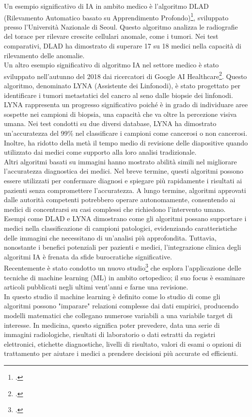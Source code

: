Un esempio significativo di IA in ambito medico è l'algoritmo DLAD (Rilevamento Automatico basato su Apprendimento Profondo)\footcite{site:intelligenza-artificiale-medicina}, sviluppato presso l'Università Nazionale di Seoul. Questo algoritmo analizza le radiografie del torace per rilevare crescite cellulari anomale, come i tumori. Nei test comparativi, DLAD ha dimostrato di superare 17 su 18 medici nella capacità di rilevamento delle anomalie.\\
Un altro esempio significativo di algoritmo IA nel settore medico è stato sviluppato nell'autunno del 2018 dai ricercatori di Google AI Healthcare\footcite{site:intelligenza-artificiale-medicina}. Questo algoritmo, denominato LYNA (Assistente dei Linfonodi), è stato progettato per identificare i tumori metastatici del cancro al seno dalle biopsie dei linfonodi. LYNA rappresenta un progresso significativo poiché è in grado di individuare aree sospette nei campioni di biopsia, una capacità che va oltre la percezione visiva umana. Nei test condotti su due diversi database, LYNA ha dimostrato un'accuratezza del 99\% nel classificare i campioni come cancerosi o non cancerosi. Inoltre, ha ridotto della metà il tempo medio di revisione delle diapositive quando utilizzato dai medici come supporto alla loro analisi tradizionale.\\
Altri algoritmi basati su immagini hanno mostrato abilità simili nel migliorare l'accuratezza diagnostica dei medici. Nel breve termine, questi algoritmi possono essere utilizzati per confermare diagnosi e spiegare più rapidamente i risultati ai pazienti senza compromettere l'accuratezza. A lungo termine, algoritmi approvati dalle autorità competenti potrebbero operare autonomamente, consentendo ai medici di concentrarsi su casi complessi che richiedono l'intervento umano.\\
Esempi come DLAD e LYNA dimostrano come gli algoritmi possano supportare i medici nella classificazione di campioni patologici, evidenziando caratteristiche delle immagini che necessitano di un'analisi più approfondita. Tuttavia, nonostante i benefici potenziali per pazienti e medici, l'integrazione clinica degli algoritmi IA è frenata da sfide burocratiche significative.\\

Recentemente è stato condotto un nuovo studio\footcite{womak:machine-learning-in-orthopedics} che esplora l'applicazione delle tecniche di machine learning (ML) in ambito ortopedico; il suo focus è esaminare articoli pubblicati negli ultimi vent'anni e farne una revisione.\\
In questo studio il machine learning è definito come lo studio di come gli algoritmi possono "imparare" relazioni complesse dai dati empirici, producendo modelli matematici che collegano numerose variabili a una variabile target di interesse. In medicina, questo significa poter prevedere, data una serie di immagini radiologiche, risultati di laboratorio o dati estratti da registri elettronici, etichette diagnostiche, livelli di risultato, valori di esami o opzioni di trattamento per aiutare i medici a prendere decisioni più accurate ed efficienti.\\

